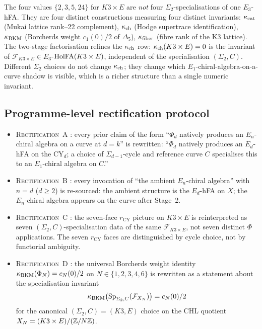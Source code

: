 \begin{remark}
\label{wn:rmk:2-3-5-24-reinterpretation}
The four values $\{2, 3, 5, 24\}$ for $K3\times E$ are
\emph{not} four $\Sigma_2$-specialisations of one $E_3$-hFA. They are four
distinct constructions measuring four distinct invariants: $\kappa_{\mathrm{cat}}$ (Mukai
lattice rank--22 complement), $\kappa_{\mathrm{ch}}$ (Hodge supertrace identification),
$\kappa_{\mathrm{BKM}}$ (Borcherds weight $c_1(0)/2$ of $\Delta_5$), $\kappa_{\mathrm{fiber}}$ (fibre rank of
the K3 lattice). The two-stage factorisation refines the $\kappa_{\mathrm{ch}}$ row:
$\kappa_{\mathrm{ch}}(K3\times E) = 0$ is the invariant of
$\mathcal{F}_{K3\times E} \in E_3$-$\mathrm{HolFA}(K3\times E)$, independent of the
specialisation $(\Sigma_2, C)$. Different $\Sigma_2$ choices do not change
$\kappa_{\mathrm{ch}}$; they change which $E_1$-chiral-algebra-on-a-curve shadow is
visible, which is a richer structure than a single numeric invariant.
\end{remark}

\subsection{Programme-level rectification protocol}
\label{wn:subsec:programme-rectification}

\begin{itemize}
\item \textsc{Rectification~A} \ClaimStatusCorrected: every prior claim of the
form ``$\Phi_d$ natively produces an $E_n$-chiral algebra on a curve at
$d = k$'' is rewritten: ``$\Phi_d$ natively produces an $E_d$-hFA on the
CY$_d$; a choice of $\Sigma_{d-1}$-cycle and reference curve $C$ specialises
this to an $E_1$-chiral algebra on $C$.''

\item \textsc{Rectification~B} \ClaimStatusCorrected: every invocation of
``the ambient $E_n$-chiral algebra'' with $n = d$ ($d \geq 2$) is
re-sourced: the ambient structure is the $E_d$-hFA on $X$; the $E_n$-chiral
algebra appears on the curve after Stage~2.

\item \textsc{Rectification~C} \ClaimStatusConjectured: the seven-face
$r_{\mathrm{CY}}$ picture on $K3 \times E$
is reinterpreted
as seven $(\Sigma_2, C)$-specialisation data of the same
$\mathcal{F}_{K3\times E}$, not seven distinct $\Phi$ applications. The
seven $r_{\mathrm{CY}}$ faces are distinguished by cycle choice, not by
functorial ambiguity.

\item \textsc{Rectification~D} \ClaimStatusConjectured: the universal
Borcherds weight identity $\kappa_{\mathrm{BKM}}(\Phi_N) = c_N(0)/2$ on
$N \in \{1,2,3,4,6\}$ is rewritten as a statement about the specialisation
invariant
$$
\kappa_{\mathrm{BKM}}\!\left(\mathrm{Sp}_{\Sigma_2, C}(\mathcal{F}_{X_N})\right) = c_N(0)/2
$$
for the canonical $(\Sigma_2, C) = (K3, E)$ choice on the CHL quotient
$X_N = (K3 \times E)/(\mathbb{Z}/N\mathbb{Z})$.
\end{itemize}

